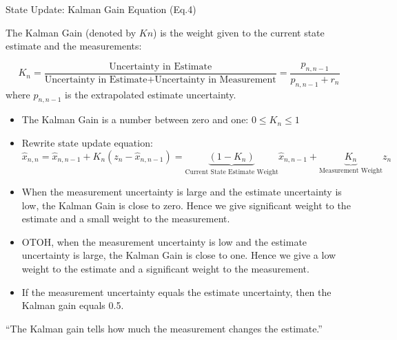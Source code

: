 \begin{frame}{State Update: Kalman Gain Equation (Eq.4)}

The Kalman Gain (denoted by $Kn$) is the weight given to the current state estimate and the measurements:

\begin{equation*}
    \boxed{K_n = \frac{\text{Uncertainty in Estimate}}{\text{Uncertainty in Estimate} + \text{Uncertainty in Measurement}} = \frac{p_{n,n-1}}{p_{n,n-1} + r_n}}
\end{equation*}
where $p_{n,n-1}$ is the extrapolated estimate uncertainty.
\begin{itemize}
    \item The Kalman Gain is a number between zero and one: $0\leq K_n \leq 1$
    \item Rewrite state update equation:
    $$\hat{x}_{n,n} = \hat{x}_{n,n-1} + K_n\left(z_n-\hat{x}_{n,n-1}\right) = \underbrace{(1-K_n)}_{\text{Current State Estimate Weight}}\hat{x}_{n,n-1} + \underbrace{K_n}_{\text{Measurement Weight}} z_n$$
    
    \item When the measurement uncertainty is large and the estimate uncertainty is low, the Kalman Gain is close to zero. Hence we give significant weight to the estimate and a small weight to the measurement.

\item OTOH, when the measurement uncertainty is low and the estimate uncertainty is large, the Kalman Gain is close to one. Hence we give a low weight to the estimate and a significant weight to the measurement.

\item If the measurement uncertainty equals the estimate uncertainty, then the Kalman gain equals 0.5.
\end{itemize}
\begin{exampleblock}{}
  {\large ``The Kalman gain tells how much the measurement changes the estimate.''}
\end{exampleblock}
\end{frame}

